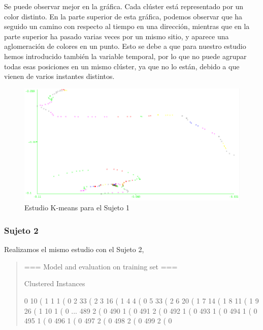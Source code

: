 \documentclass[a4paper, 12pt]{article}
\begin{document}
Se puede observar mejor en la gr\'afica. Cada cl\'uster est\'a representado por un color distinto. En la parte superior de esta gr\'afica, podemos observar que ha seguido un camino con respecto al tiempo en una direcci\'on, mientras que en la parte superior ha pasado varias veces por un mismo sitio, y aparece una aglomeraci\'on de colores en un punto. Esto se debe a que para nuestro estudio hemos introducido tambi\'en la variable temporal, por lo que no puede agrupar todas esas posiciones en un mismo cl\'uster, ya que no lo est\'an, debido a que vienen de varios instantes distintos. \\

\begin{figure}[H]
	\includegraphics[scale=.5]{../comparativa/kMeansSujeto1.png}
	\caption{Estudio K-means para el Sujeto 1}
\end{figure}


\subsubsection{Sujeto 2}

Realizamos el mismo estudio con el Sujeto 2,\\

\begin{verse}
=== Model and evaluation on training set ===

Clustered Instances

  0        10 (  1%
  1         1 (  0%
  2        33 (  2%
  3        16 (  1%
  4         4 (  0%
  5        33 (  2%
  6        20 (  1%
  7        14 (  1%
  8        11 (  1%
  9        26 (  1%
 10         1 (  0%
 ...
 489         2 (  0%
490         1 (  0%
491         2 (  0%
492         1 (  0%
493         1 (  0%
494         1 (  0%
495         1 (  0%
496         1 (  0%
497         2 (  0%
498         2 (  0%
499         2 (  0%
\end{verse}
\end{document}
